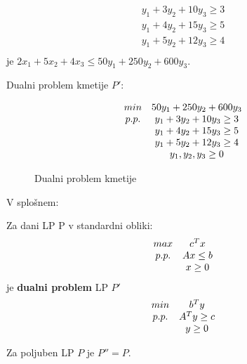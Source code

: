 \documentclass[11pt, a4paper]{article}
\begin{document}
    \[
        \begin{array}{c}
            y_1+3y_2+10y_3 \ge 3 \\
            y_1+4y_2+15y_3 \ge 5 \\
            y_1+5y_2+12y_3 \ge 4 \\ 
        \end{array}
    \]
    je \(2x_1+5x_2+4x_3 \le 50y_1+250y_2+600y_3\).

    Dualni problem kmetije \(P'\):
    \begin{figure}[h!]
        \[
            \begin{array}{ c c }
                min & 50 y_1+250y_2+600y_3 \\
                p.p. & y_1+3y_2+10y_3 \ge 3 \\
                & y_1+4y_2+15y_3 \ge 5 \\
                & y_1+5y_2+12y_3 \ge 4 \\
                & y_1,y_2,y_3 \ge 0 \\
            \end{array}
        \]
        \caption{Dualni problem kmetije}
    \end{figure}

    V splošnem:
    \begin{definition}[Dualni LP]
        Za dani LP P v standardni obliki:
        \[
            \begin{array}{ c c }
                max & c^Tx \\
                p.p. & Ax \le b \\
                & x \ge 0 \\
            \end{array}    
        \]
        je \textbf{dualni problem} LP \(P'\)
        \[
            \begin{array}{ c c }
                min & b^Ty \\
                p.p. & A^Ty \ge c \\
                & y \ge 0 \\
            \end{array}
        \]
    \end{definition}

    \begin{theorem}
        Za poljuben LP \(P\) je \(P''=P\).
    \end{theorem}
\end{document}
